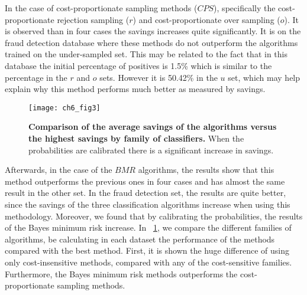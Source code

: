 In the case of cost-proportionate sampling methods ($CPS$), specifically the 
cost-proportionate rejection sampling ($r$) and cost-proportionate over 
sampling ($o$). It is observed than in four cases the savings increases quite 
significantly. It is on the fraud detection database where these methods do not outperform the 
algorithms trained on the under-sampled set. This may be related to the fact that in this 
database the initial percentage of positives is 1.5\% which is similar to the percentage in the 
$r$ and   $o$ sets. However it is 50.42\% in the $u$ set, which may help explain why this method 
performs much better as measured by savings.

\begin{figure}[!t]
  \centering
  \texttt{[image: ch6\_fig3]}
  \caption{\textbf{Comparison of the average savings of the algorithms versus the 
    highest savings by family of classifiers.} When the probabilities are calibrated there is a 
    significant increase in savings.}
  \label{fig:6:comparison_family}
\end{figure}

Afterwards, in the case of the $BMR$ algorithms, the results show that this method outperforms 
the previous ones in four cases and has almost the same result in the other set. In the fraud 
detection  set, the results are quite better, since the savings of the three classification 
algorithms increase when using this methodology. Moreover, we found that by calibrating the 
probabilities, the results of the Bayes minimum risk increase. In 
\figurename{~\ref{fig:6:comparison_family}}, we compare the different families of algorithms, be 
calculating in each dataset the performance of the methods compared with the best method. First, it 
is shown the huge difference of using only cost-insensitive methods, compared with any of the 
cost-sensitive families. Furthermore, the Bayes minimum risk methods outperforms the 
cost-proportionate sampling methods.

